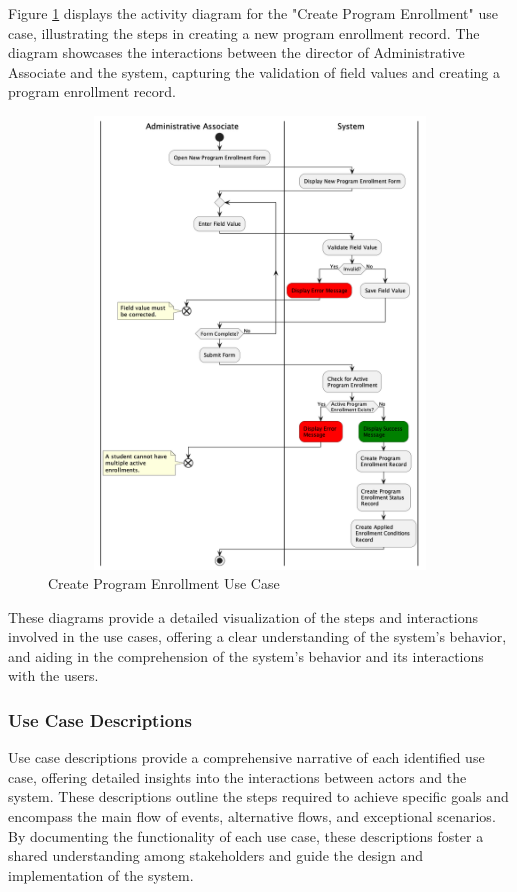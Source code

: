 \documentclass[12pt]{article}
\begin{document}
Figure \ref{fig:create_program_enrollment_use_case} displays the activity diagram for the "Create Program Enrollment" use case, illustrating the steps in creating a new program enrollment record. The diagram showcases the interactions between the director of Administrative Associate and the system, capturing the validation of field values and creating a program enrollment record.

\begin{figure}[ht]
    \centering
    \caption{Create Program Enrollment Use Case}
    \label{fig:create_program_enrollment_use_case}
    \includegraphics[width=12cm,height=12cm]{create-program-enrollment}
\end{figure}

These diagrams provide a detailed visualization of the steps and interactions involved in the use cases, offering a clear understanding of the system's behavior, and aiding in the comprehension of the system's behavior and its interactions with the users. 

\subsubsection{Use Case Descriptions}
Use case descriptions provide a comprehensive narrative of each identified use case, offering detailed insights into the interactions between actors and the system. These descriptions outline the steps required to achieve specific goals and encompass the main flow of events, alternative flows, and exceptional scenarios. By documenting the functionality of each use case, these descriptions foster a shared understanding among stakeholders and guide the design and implementation of the system.
\end{document}

